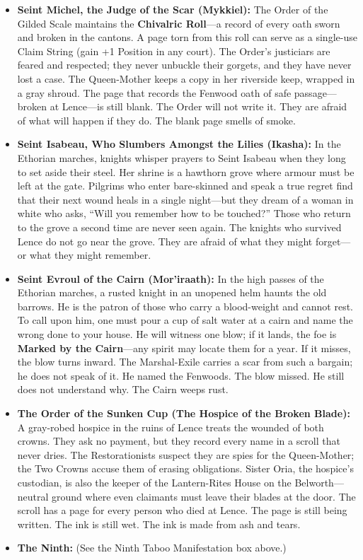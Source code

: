 \begin{itemize}
  \item \textbf{Seint Michel, the Judge of the Scar (Mykkiel):} The Order of the Gilded Scale maintains the \textbf{Chivalric Roll}---a record of every oath sworn and broken in the cantons. A page torn from this roll can serve as a single-use Claim String (gain +1 Position in any court). The Order's justiciars are feared and respected; they never unbuckle their gorgets, and they have never lost a case. The Queen-Mother keeps a copy in her riverside keep, wrapped in a gray shroud. The page that records the Fenwood oath of safe passage---broken at Lence---is still blank. The Order will not write it. They are afraid of what will happen if they do. The blank page smells of smoke.
  \item \textbf{Seint Isabeau, Who Slumbers Amongst the Lilies (Ikasha):} In the Ethorian marches, knights whisper prayers to Seint Isabeau when they long to set aside their steel. Her shrine is a hawthorn grove where armour must be left at the gate. Pilgrims who enter bare-skinned and speak a true regret find that their next wound heals in a single night---but they dream of a woman in white who asks, ``Will you remember how to be touched?'' Those who return to the grove a second time are never seen again. The knights who survived Lence do not go near the grove. They are afraid of what they might forget---or what they might remember.
  \item \textbf{Seint Evroul of the Cairn (Mor'iraath):} In the high passes of the Ethorian marches, a rusted knight in an unopened helm haunts the old barrows. He is the patron of those who carry a blood-weight and cannot rest. To call upon him, one must pour a cup of salt water at a cairn and name the wrong done to your house. He will witness one blow; if it lands, the foe is \textbf{Marked by the Cairn}---any spirit may locate them for a year. If it misses, the blow turns inward. The Marshal-Exile carries a scar from such a bargain; he does not speak of it. He named the Fenwoods. The blow missed. He still does not understand why. The Cairn weeps rust.
  \item \textbf{The Order of the Sunken Cup (The Hospice of the Broken Blade):} A gray-robed hospice in the ruins of Lence treats the wounded of both crowns. They ask no payment, but they record every name in a scroll that never dries. The Restorationists suspect they are spies for the Queen-Mother; the Two Crowns accuse them of erasing obligations. Sister Oria, the hospice's custodian, is also the keeper of the Lantern-Rites House on the Belworth---neutral ground where even claimants must leave their blades at the door. The scroll has a page for every person who died at Lence. The page is still being written. The ink is still wet. The ink is made from ash and tears.
  \item \textbf{The Ninth:} (See the Ninth Taboo Manifestation box above.)
\end{itemize}

